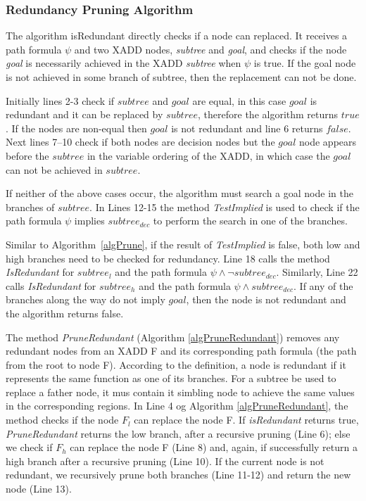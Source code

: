 \documentclass[twoside,11pt]{article}
\begin{document}
\subsubsection{Redundancy Pruning Algorithm}
\label{redundancyprunning}

The algorithm isRedundant directly checks if a node can replaced. It receives a path formula $\psi$ and two XADD nodes, \emph{subtree} and \emph{goal}, and checks if the node \emph{goal} is necessarily achieved in the XADD \emph{subtree} when $\psi$ is true. If the goal node is not achieved in some branch of subtree, then the replacement can not be done. 

Initially lines 2-3 check if $\mathit{subtree}$ and $\mathit{goal}$ are equal, in this case $\mathit{goal}$ is redundant and it can be replaced by $\mathit{subtree}$, therefore the algorithm returns $\mathit{true}$. If the nodes are non-equal then $\mathit{goal}$ is not redundant and line 6 returns $\mathit{false}$. Next lines 7--10 check if both nodes are decision nodes but the $\mathit{goal}$ node appears before the $\mathit{subtree}$ in the variable ordering of the XADD, in which case the $\mathit{goal}$ can not be achieved in $\mathit{subtree}$. 

If neither of the above cases occur, the algorithm must search a goal node in the branches of $\mathit{subtree}$. In Lines 12-15 the method \emph{TestImplied} is used to check if the path formula $\psi$ implies $subtree_{dec}$ to perform the search in one of the branches.   

Similar to Algorithm~\ref{algPrune}, if the result of \emph{TestImplied} is false, both low and high branches need to be checked for redundancy. Line 18 calls the method \emph{IsRedundant} for $\mathit{subtree}_l$ and the path formula $\psi \wedge \neg subtree_{dec}$. Similarly, Line 22 calls \emph{IsRedundant} for $\mathit{subtree}_h$ and the path formula $\psi \wedge subtree_{dec}$. If any of the branches along the way do not imply $\mathit{goal}$, then the node is not redundant and the algorithm returns false. 

The method \emph{PruneRedundant} (Algorithm \ref{algPruneRedundant}) removes any redundant nodes from an XADD F and its corresponding path formula (the path from the root to node F). According to the definition, a node is redundant if it represents the same function as one of its branches. For a subtree be used to replace a father node, it mus contain it simbling node to achieve the same values in the corresponding regions. In Line 4 og Algorithm \ref{algPruneRedundant}, the method checks if the node $F_l$ can replace the node F. If \emph{isRedundant} returns true, \emph{PruneRedundant} returns the low branch, after a recursive pruning (Line 6); else we check if $F_h$ can replace the node F (Line 8) and, again, if successfully return a high branch after a recursive pruning (Line 10). If the current node is not redundant, we recursively prune both branches (Line 11-12) and return the new node (Line 13). 
\end{document}
